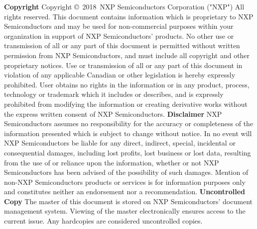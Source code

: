 \documentclass[oneside]{book}
\newcommand{\copyrightYear}{2018}        %
\newcommand{\+}{\discretionary{\mbox{\scriptsize$\hookleftarrow$}}{}{}}
\begin{document}
\footnotesize
{ \setlength{\parindent}{0pt} \textbf{Copyright} }
\newline \newline
\vspace{4pt}
Copyright \copyright \ \copyrightYear \ NXP Semiconductors Corporation ("NXP") All rights reserved.
\newline
\scriptsize
This document contains information which is proprietary to NXP Semiconductors and may be used for non-commercial purposes within your organization in support of NXP Semiconductors'  products.
No other use or transmission of all or any part of this document is permitted without written permission from NXP Semiconductors, and must include all copyright and other proprietary notices.
Use or transmission of all or any part of this document in violation of any applicable Canadian or other legislation is hereby expressly prohibited.
\vspace{4pt}
\newline
User obtains no rights in the information or in any product, process, technology or trademark which it includes or describes, and is expressly prohibited from modifying the information or creating derivative works without the express written consent of NXP Semiconductors.
\newline \newline \newline
{\footnotesize \textbf{Disclaimer}}
\vspace{5pt}
\newline
NXP Semiconductors assumes no responsibility for the accuracy or completeness of the information presented which is subject to change without notice.
In no event will NXP Semiconductors be liable for any direct, indirect, special, incidental or consequential damages, including lost profits, lost business or lost data, resulting from the use of or reliance upon the information, whether or not NXP Semiconductors has been advised of the possibility of such damages.
\vspace{3pt}
\newline
Mention of non-NXP Semiconductors products or services is for information purposes only and constitutes neither an endorsement nor a recommendation.
\newline \newline \newline
{\footnotesize \textbf{Uncontrolled Copy}}
\vspace{5pt}
\newline
The master of this document is stored on NXP Semiconductors' document management system.  Viewing of the master electronically ensures access to the current issue. Any hardcopies are considered uncontrolled copies.
\newpage
\normalsize
\end{document}
